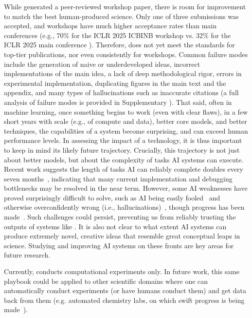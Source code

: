 While \ouralgo generated a peer-reviewed workshop paper, there is room for improvement to match the best human-produced science.
Only one of three submissions was accepted, and workshops have much higher acceptance rates than main conferences (e.g., 70\% for the ICLR 2025 ICBINB workshop \citep{ICBINB2025} vs. 32\% for the ICLR 2025 main conference \citep{ICLR2025FactSheet}).
Therefore, \ouralgo does not yet meet the standards for top-tier publications, nor even consistently for workshops.
Common failure modes include the generation of naive or underdeveloped ideas, incorrect implementations of the main idea, a lack of deep methodological rigor, errors in experimental implementation, duplicating figures in the main text and the appendix, and many types of hallucinations such as inaccurate citations (a full analysis of failure modes is provided in Supplementary ).
That said, often in machine learning, once something begins to work (even with clear flaws), in a few short years with scale (e.g., of compute and data), better core models, and better techniques, the capabilities of a system become surprising, and can exceed human performance levels. In assessing the impact of a technology, it is thus important to keep in mind its likely future trajectory. Crucially, this trajectory is not just about better models, but about the complexity of tasks AI systems can execute. Recent work suggests the length of tasks AI can reliably complete doubles every seven months~\citep{metr2025longtasks}, indicating that many current implementation and debugging bottlenecks may be resolved in the near term. However, some AI weaknesses have proved surprisingly difficult to solve, such as AI being easily fooled~\citep{nguyen2015deep, szegedy2013intriguing} and otherwise overconfidently wrong (i.e., hallucinations)~\citep{maynez2020faithfulness}, though progress has been made~\citep{openai2025gpt5,Huang2025HallucinationSurvey}. Such challenges could persist, preventing us from reliably trusting the outputs of systems like \ouralgo. It is also not clear to what extent AI systems can produce extremely novel, creative ideas that resemble great conceptual leaps in science. Studying and improving AI systems on these fronts are key areas for future research.

Currently, \ouralgo conducts computational experiments only. In future work, this same playbook could be applied to other scientific domains where one can automatically conduct experiments (or have humans conduct them) and get data back from them (e.g. automated chemistry labs, on which swift progress is being made~\citep{boiko2023autonomous}).


